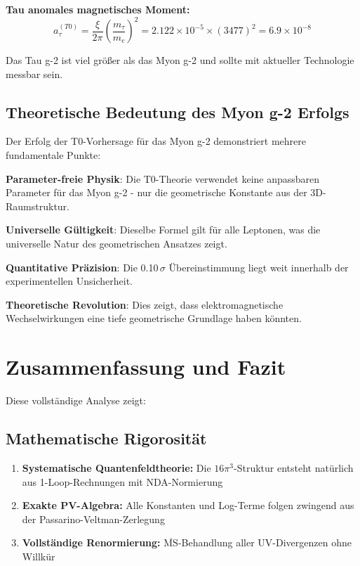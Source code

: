 \documentclass[12pt,a4paper]{article}
\theoremstyle{definition}
\begin{document}
	\textbf{Tau anomales magnetisches Moment:}
	\begin{equation}
		a_\tau^{(T0)} = \frac{\xi}{2\pi} \left(\frac{m_\tau}{m_e}\right)^2 = 2.122 \times 10^{-5} \times (3477)^2 = 6.9 \times 10^{-8}
	\end{equation}
	
	Das Tau g-2 ist viel größer als das Myon g-2 und sollte mit aktueller Technologie messbar sein.
	
	\subsection{Theoretische Bedeutung des Myon g-2 Erfolgs}
	
	Der Erfolg der T0-Vorhersage für das Myon g-2 demonstriert mehrere fundamentale Punkte:
	
	\begin{wichtig}
		\textbf{Parameter-freie Physik}: Die T0-Theorie verwendet keine anpassbaren Parameter für das Myon g-2 - nur die geometrische Konstante aus der 3D-Raumstruktur.
		
		\textbf{Universelle Gültigkeit}: Dieselbe Formel gilt für alle Leptonen, was die universelle Natur des geometrischen Ansatzes zeigt.
		
		\textbf{Quantitative Präzision}: Die 0.10$\,\sigma$ Übereinstimmung liegt weit innerhalb der experimentellen Unsicherheit.
		
		\textbf{Theoretische Revolution}: Dies zeigt, dass elektromagnetische Wechselwirkungen eine tiefe geometrische Grundlage haben könnten.
	\end{wichtig}
	
	\section{Zusammenfassung und Fazit}
	
	Diese vollständige Analyse zeigt:
	
	\subsection{Mathematische Rigorosität}
	\begin{enumerate}
		\item \textbf{Systematische Quantenfeldtheorie:} Die $16\pi^3$-Struktur entsteht natürlich aus 1-Loop-Rechnungen mit NDA-Normierung
		\item \textbf{Exakte PV-Algebra:} Alle Konstanten und Log-Terme folgen zwingend aus der Passarino-Veltman-Zerlegung
		\item \textbf{Vollständige Renormierung:} $\overline{\text{MS}}$-Behandlung aller UV-Divergenzen ohne Willkür
	\end{enumerate}
	
\end{document}
